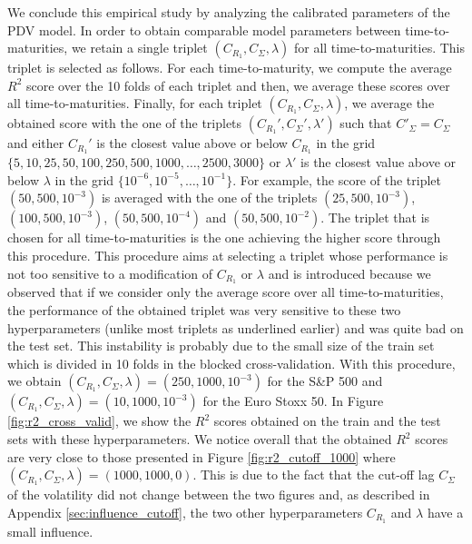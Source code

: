 We conclude this empirical study by analyzing the calibrated parameters of the PDV model. In order to obtain comparable model parameters between time-to-maturities, we retain a single triplet $(C_{R_1},C_{\Sigma},\lambda)$ for all time-to-maturities. This triplet is selected as follows. For each time-to-maturity, we compute the average $R^2$ score over the 10 folds of each triplet and then, we average these scores over all time-to-maturities. Finally, for each triplet $(C_{R_1},C_{\Sigma},\lambda)$, we average the obtained score with the one of the triplets $(C_{R_1}',C_{\Sigma}',\lambda')$ such that $C'_{\Sigma}=C_{\Sigma}$ and either $C_{R_1}'$ is the closest value above or below $C_{R_1}$ in the grid $\{5,10,25,50,100,250,500,1000,\dots,2500,3000\}$ or $\lambda'$ is the closest value above or below $\lambda$ in the grid $\{10^{-6},10^{-5},\dots,10^{-1}\}$. For example, the score of the triplet $(50,500,10^{-3})$ is averaged with the one of the triplets $(25,500,10^{-3})$, $(100,500,10^{-3})$, $(50,500,10^{-4})$ and $(50,500,10^{-2})$. The triplet that is chosen for all time-to-maturities is the one achieving the higher score through this procedure. This procedure aims at selecting a triplet whose performance is not too sensitive to a modification of $C_{R_1}$ or $\lambda$ and is introduced because we observed that if we consider only the average score over all time-to-maturities, the performance of the obtained triplet was very sensitive to these two hyperparameters (unlike most triplets as underlined earlier) and was quite bad on the test set. This instability is probably due to the small size of the train set which is divided in 10 folds in the blocked cross-validation. With this procedure, we obtain $(C_{R_1},C_{\Sigma},\lambda)=(250,1000,10^{-3})$ for the S\&P 500 and $(C_{R_1},C_{\Sigma},\lambda)=(10,1000,10^{-3})$ for the Euro Stoxx 50. In Figure \ref{fig:r2_cross_valid}, we show the $R^2$ scores obtained on the train and the test sets with these hyperparameters. We notice overall that the obtained $R^2$ scores are very close to those presented in Figure \ref{fig:r2_cutoff_1000} where $(C_{R_1},C_{\Sigma},\lambda)=(1000,1000,0)$. This is due to the fact that the cut-off lag $C_{\Sigma}$ of the volatility did not change between the two figures and, as described in Appendix \ref{sec:influence_cutoff}, the two other hyperparameters $C_{R_1}$ and $\lambda$ have a small influence. \\

